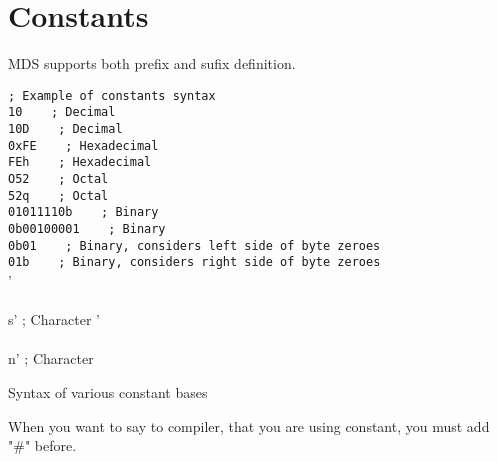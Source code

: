         \section{Constants}
        MDS supports both prefix and sufix definition.
                \begin{code}[h!]
                            {\color{highlight_comment}\verb'; Example of constants syntax'}\\
                            {\color{highlight_constant}\verb'10'}\verb' '\verb'   '{\color{highlight_comment}\verb'; Decimal'}\\
                            {\color{highlight_constant}\verb'10D'}\verb' '\verb'   '{\color{highlight_comment}\verb'; Decimal'}\\
                            {\color{highlight_constant}\verb'0xFE'}\verb' '\verb'   '{\color{highlight_comment}\verb'; Hexadecimal'}\\
                            {\color{highlight_constant}\verb'FEh'}\verb' '\verb'   '{\color{highlight_comment}\verb'; Hexadecimal'}\\
                            {\color{highlight_constant}\verb'O52'}\verb' '\verb'   '{\color{highlight_comment}\verb'; Octal'}\\
                            {\color{highlight_constant}\verb'52q'}\verb' '\verb'   '{\color{highlight_comment}\verb'; Octal'}\\
                            {\color{highlight_constant}\verb'01011110b'}\verb' '\verb'   '{\color{highlight_comment}\verb'; Binary'}\\
                            {\color{highlight_constant}\verb'0b00100001'}\verb' '\verb'   '{\color{highlight_comment}\verb'; Binary'}\\
                            {\color{highlight_constant}\verb'0b01'}\verb' '\verb'   '{\color{highlight_comment}\verb'; Binary, considers left side of byte zeroes'}\\
                            {\color{highlight_constant}\verb'01b'}\verb' '\verb'   '{\color{highlight_comment}\verb'; Binary, considers right side of byte zeroes'}\\
                            '\\\\s' ; Character
                            '\\\\n' ; Character

                    \caption{Syntax of various constant bases}
                \end{code}
                When you want to say to compiler, that you are using constant, you must add "\#" before.



